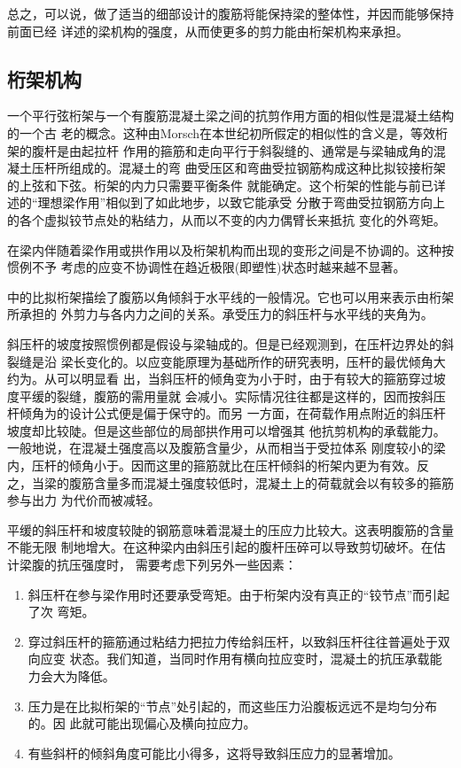 \documentclass[12pt,a4paper]{book}
\begin{document}
总之，可以说，做了适当的细部设计的腹筋将能保持梁的整体性，并因而能够保持前面已经
详述的梁机构的强度，从而使更多的剪力能由桁架机构来承担。

\subsection{桁架机构}

一个平行弦桁架与一个有腹筋混凝土梁之间的抗剪作用方面的相似性是混凝土结构的一个古
老的概念。这种由Morsch在本世纪初所假定的相似性的含义是，等效桁架的腹杆是由起拉杆
作用的箍筋和走向平行于斜裂缝的、通常是与梁轴成角的混凝土压杆所组成的。混凝土的弯
曲受压区和弯曲受拉钢筋构成这种比拟铰接桁架的上弦和下弦。桁架的内力只需要平衡条件
就能确定。这个桁架的性能与前已详述的“理想梁作用”相似到了如此地步，以致它能承受
分散于弯曲受拉钢筋方向上的各个虚拟铰节点处的粘结力，从而以不变的内力偶臂长来抵抗
变化的外弯矩。

在梁内伴随着梁作用或拱作用以及桁架机构而出现的变形之间是不协调的。这种按惯例不予
考虑的应变不协调性在趋近极限(即塑性)状态时越来越不显著。

中的比拟桁架描绘了腹筋以角倾斜于水平线的一般情况。它也可以用来表示由桁架所承担的
外剪力与各内力之间的关系。承受压力的斜压杆与水平线的夹角为。

斜压杆的坡度按照惯例都是假设与梁轴成的。但是已经观测到，在压杆边界处的斜裂缝是沿
梁长变化的。以应变能原理为基础所作的研究表明，压杆的最优倾角大约为。从可以明显看
出，当斜压杆的倾角变为小于时，由于有较大的箍筋穿过坡度平缓的裂缝，腹筋的需用量就
会减小。实际情况往往都是这样的，因而按斜压杆倾角为的设计公式便是偏于保守的。而另
一方面，在荷载作用点附近的斜压杆坡度却比较陡。但是这些部位的局部拱作用可以增强其
他抗剪机构的承载能力。一般地说，在混凝土强度高以及腹筋含量少，从而相当于受拉体系
刚度较小的梁内，压杆的倾角小于。因而这里的箍筋就比在压杆倾斜的桁架内更为有效。反
之，当梁的腹筋含量多而混凝土强度较低时，混凝土上的荷载就会以有较多的箍筋参与出力
为代价而被减轻。

平缓的斜压杆和坡度较陡的钢筋意味着混凝土的压应力比较大。这表明腹筋的含量不能无限
制地增大。在这种梁内由斜压引起的腹杆压碎可以导致剪切破坏。在估计梁腹的抗压强度时，
需要考虑下列另外一些因素：
\begin{enumerate}
\item 斜压杆在参与梁作用时还要承受弯矩。由于桁架内没有真正的“铰节点”而引起了次
  弯矩。
\item 穿过斜压杆的箍筋通过粘结力把拉力传给斜压杆，以致斜压杆往往普遍处于双向应变
  状态。我们知道，当同时作用有横向拉应变时，混凝土的抗压承载能力会大为降低。
\item 压力是在比拟桁架的“节点”处引起的，而这些压力沿腹板远远不是均匀分布的。因
  此就可能出现偏心及横向拉应力。
\item 有些斜杆的倾斜角度可能比小得多，这将导致斜压应力的显著增加。
\end{enumerate}
\end{document}
